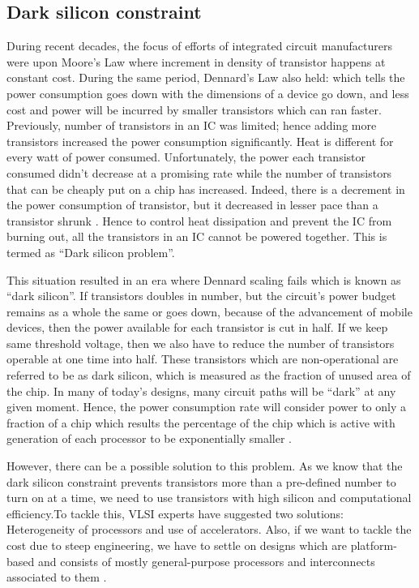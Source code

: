 \documentclass[journal]{IEEEtran}
\begin{document}
\subsection{Dark silicon constraint}
During recent decades, the focus of efforts of integrated circuit manufacturers were upon Moore’s Law where increment in density of transistor happens at constant cost. During the same period, Dennard’s Law also held: which tells the power consumption goes down with the dimensions of a device go down, and less cost and power will be incurred by smaller transistors which can ran faster. Previously, number of transistors in an IC was limited; hence adding more transistors increased the power consumption significantly. Heat is different for every watt of power consumed. Unfortunately, the power each transistor consumed didn't decrease at a promising rate while the number of transistors that can be cheaply put on a chip has increased. Indeed, there is a decrement in the power consumption of transistor, but it decreased in lesser pace than a transistor shrunk \cite{paper9}. Hence to control heat dissipation and prevent the IC from burning out, all the transistors in an IC cannot be powered together. This is termed as ``Dark silicon problem''.

\par This situation resulted in an era where Dennard scaling fails which is known as ``dark silicon''. If transistors doubles in number, but the circuit's power budget remains as a whole the same or goes down, because of the advancement of mobile devices, then the power available for each transistor is cut in half. If we keep same threshold voltage, then we also have to reduce the number of transistors operable at one time into half. These transistors which are non-operational are referred to be as dark silicon, which is measured as the fraction of unused area of the chip. In many of today’s designs, many circuit paths will be ``dark'' at any given moment. Hence, the power consumption rate will consider power to only a fraction of a chip which results the percentage of the chip which is active with generation of each processor to be exponentially smaller \cite{paper2}.

\par However, there can be a possible solution to this problem. As we know that the dark silicon constraint prevents transistors more than a pre-defined number to turn on at a time, we need to use transistors with high silicon and computational efficiency.To tackle this, VLSI experts have suggested two solutions: Heterogeneity of processors and use of accelerators. Also, if we want to tackle the cost due to steep engineering, we have to settle on designs which are platform-based and consists of mostly general-purpose processors and interconnects associated to them \cite{paper2}.
\end{document}
